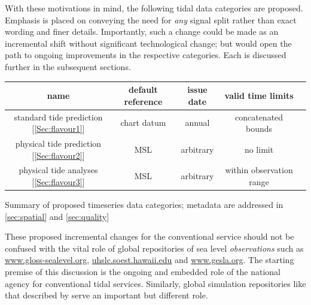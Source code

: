 With these motivations in mind, the following tidal data categories are proposed.   Emphasis is placed on conveying the need for \textit{any} signal split rather than exact wording and finer details.  Importantly, such a change could be made as an incremental shift without significant technological change; but would open the path to ongoing improvements in the respective categories. 
Each is discussed further in the subsequent sections.

\begin{specialtable}[H]\centering
    \begin{tabular}{ |c|c|c|c|c| }
    \hline
    name    & 
        default reference  & 
        issue date         & 
        valid time limits  \\
    \hline
    standard tide prediction [\ref{Sec:flavour1}] & 
        chart datum & annual & 
        concatenated bounds\\
    \hline
    physical tide prediction [\ref{Sec:flavour2}]& 
        MSL       & 
        arbitrary & 
        no limit \\
    \hline
    physical tide analyses [\ref{Sec:flavour3}]& 
        MSL       & 
        arbitrary & 
        within observation range \\
    \hline
    \end{tabular}
    \caption{Summary of proposed timeseries data categories; metadata are addressed in \ref{sec:spatial} and \ref{sec:quality} }
    \label{tab:typesSummary}
\end{specialtable}

These proposed incremental changes for the conventional service should not be confused with the vital role of global repositories of sea level \textit{observations} such as  \url{www.gloss-sealevel.org}, \url{uhslc.soest.hawaii.edu} and \url{www.gesla.org}.    The starting premise of this discussion is the ongoing and embedded role of the national agency for conventional tidal services.    
Similarly, global simulation repositories like that described by \citeauthor{10.3389/fmars.2020.00263}
serve an important but different role.

